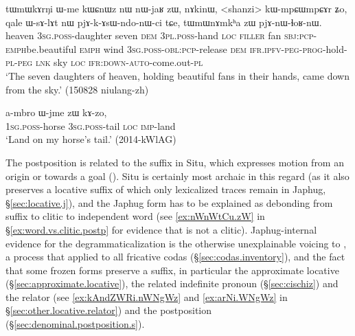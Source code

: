 \begin{exe}
\ex \label{ex:nAmkha.zW.pjAnWlhoRnW}
\gll tɯmɯkɤrŋi ɯ-me kɯɕnɯz nɯ nɯ-jaʁ zɯ, nɤkinɯ, <shanzi> kɯ-mpɕɯ\redp{}mpɕɤr ʑo, qale ɯ-sɤ-lɤt nɯ pjɤ-k-ɤsɯ-ndo-nɯ-ci tɕe,  tɯmɯnɤmkʰa zɯ pjɤ-nɯ-ɬoʁ-nɯ. \\
heaven \textsc{3sg}.\textsc{poss}-daughter seven \textsc{dem} \textsc{3pl}.\textsc{poss}-hand \textsc{loc} \textsc{filler} fan \textsc{sbj}:\textsc{pcp}-\textsc{emph}\redp{}be.beautiful \textsc{emph} wind \textsc{3sg}.\textsc{poss}-\textsc{obl}:\textsc{pcp}-release \textsc{dem} \textsc{ifr}.\textsc{ipfv}-\textsc{peg}-\textsc{prog}-hold-\textsc{pl}-\textsc{peg} \textsc{lnk} sky \textsc{loc} \textsc{ifr}:\textsc{down}-\textsc{auto}-come.out-\textsc{pl} \\
\glt `The seven daughters of heaven, holding beautiful fans in their hands, came down from the sky.' (150828 niulang-zh)
\end{exe}

\begin{exe}
\ex \label{ex:Wjme.zW.kAzo}
\gll   a-mbro ɯ-jme zɯ kɤ-zo, \\
\textsc{1sg}.\textsc{poss}-horse \textsc{3sg}.\textsc{poss}-tail \textsc{loc} \textsc{imp}-land \\ 
\glt `Land on my horse's tail.' (2014-kWlAG)
\end{exe}

The postposition  is related to the suffix  in Situ, which expresses motion from an origin or towards a goal (\citealt[330--331]{linxr93jiarong}). Situ is certainly most archaic in this regard (as it also preserves a locative  suffix of which only lexicalized traces remain in Japhug, §\ref{sec:locative.j}), and the Japhug form has to be explained as debonding  from suffix to clitic to independent word (see \ref{ex:nWnWtCu.zW} in §\ref{ex:word.vs.clitic.postp} for evidence that  is not a clitic). Japhug-internal evidence for the degrammaticalization is the otherwise unexplainable voicing to , a process that applied to all fricative codas (§\ref{sec:codas.inventory}), and the fact that some frozen forms preserve a  suffix, in particular the approximate locative  (§\ref{sec:approximate.locative}), the related indefinite pronoun  (§\ref{sec:cischiz}) and the relator  (see \ref{ex:kAndZWRi.nWNgWz}  and \ref{ex:arNi.WNgWz}  in §\ref{sec:other.locative.relator}) and the postposition    (§\ref{sec:denominal.postposition.s}).  


